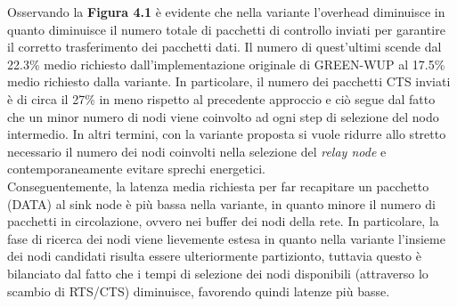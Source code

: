 \documentclass[binding=0.6cm,TFA]{sapthesis}
\begin{document}
Osservando la \textbf{Figura 4.1} è evidente che nella variante l'overhead diminuisce in quanto diminuisce il numero totale di pacchetti di controllo inviati
per garantire il corretto trasferimento dei pacchetti dati. Il numero di quest'ultimi scende dal 22.3\% medio richiesto dall'implementazione originale
di GREEN-WUP al 17.5\% medio richiesto dalla variante. In particolare, il numero dei pacchetti CTS inviati è di circa il 27\% in meno rispetto
al precedente approccio e ciò segue dal fatto che un minor numero di nodi viene coinvolto ad ogni step di selezione del nodo
intermedio. In altri termini, con la variante proposta si vuole ridurre allo stretto necessario il numero dei nodi coinvolti nella selezione del
\emph{relay node} e contemporaneamente evitare sprechi energetici.\\

Conseguentemente, la latenza media richiesta per far recapitare un pacchetto (DATA) al sink node è più bassa nella variante, in quanto minore il
numero di pacchetti in circolazione, ovvero nei buffer dei nodi della rete. In particolare, la fase di ricerca dei nodi viene lievemente estesa in
quanto nella variante l'insieme dei nodi candidati risulta essere ulteriormente partizionto, tuttavia questo è bilanciato dal fatto che i tempi
di selezione dei nodi disponibili (attraverso lo scambio di RTS/CTS) diminuisce, favorendo quindi latenze più basse.

\newpage
\end{document}
